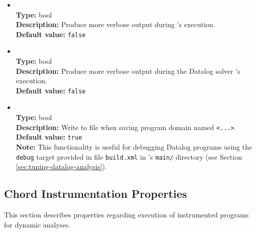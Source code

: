 \begin{itemize}
\item
{} \\
{\bf Type:} bool \\
{\bf Description:} Produce more verbose output during \Chord's execution. \\
{\bf Default value:} {\tt false} 

\item
{} \\
{\bf Type:} bool \\
{\bf Description:} Produce more verbose output during the Datalog solver \bddbddb's execution. \\
{\bf Default value:} {\tt false} 

\item
{} \\
{\bf Type:} bool \\
{\bf Description:} Write to file  when saving program domain named {\tt <...>}. \\
{\bf Default value:} {\tt true}  \\
{\bf Note:} This functionality is useful for debugging Datalog programs using the {\tt debug} target provided in file {\tt build.xml} in \Chord's {\tt main/} directory (see Section \ref{sec:tuning-datalog-analysis}).
\end{itemize}

\subsection{Chord Instrumentation Properties}

This section describes properties regarding execution of instrumented programs for dynamic analyses.


